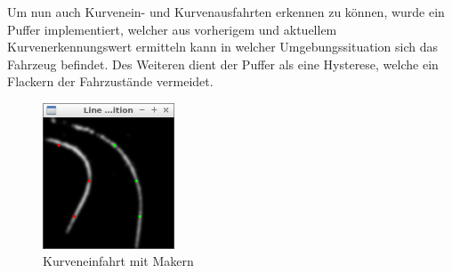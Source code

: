 Um nun auch Kurvenein- und Kurvenausfahrten erkennen zu können, wurde ein Puffer implementiert, welcher aus vorherigem und aktuellem Kurvenerkennungswert ermitteln kann in welcher Umgebungssituation sich das Fahrzeug befindet. Des Weiteren dient der Puffer als eine Hysterese, welche ein Flackern der Fahrzustände vermeidet.

\begin{figure}[ht]
	\centering
	\includegraphics[width=0.35\textwidth]{images/curve_bw.png}
	\caption{Kurveneinfahrt mit Makern}
\end{figure}
\label{Bild von Kurve}


